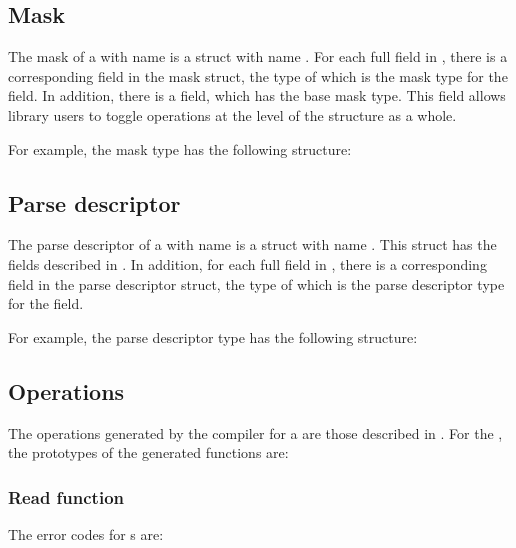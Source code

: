\subsection{Mask}
\label{sec:structs-masks}
The mask of a \Pstruct{} with name  is a \C{} struct 
with name .  For each full field in
, there is a corresponding field in the mask struct, the
type of which is the mask type for
the field.  In addition, there is a 
 field, which has the base mask type.  This field allows
library users to toggle operations at the level of the structure as a
whole. 

For example, the mask type  has the
following structure:


\subsection{Parse descriptor}
\label{sec:structs-parse-descriptors}
The parse descriptor of a \Pstruct{} with name  is a \C{}
struct with name .  This struct has the fields
described in . In addition, for
each full field in , there is a corresponding field in
the parse descriptor struct, the type of which is the parse descriptor
type for the field.

For example, the parse descriptor type  has
the following structure:

\subsection{Operations}
The operations generated by the \pads{} compiler for a \Pstruct{} are
those described in .  For the \Pstruct{}
, the prototypes of the generated functions are:


\subsubsection{Read function}
The error codes for \Pstruct{}s are:

